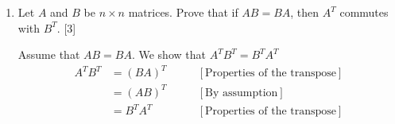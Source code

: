 \documentclass[11pt]{article}
\begin{document}
\begin{enumerate}[label=\alph*)]
    \color{black}

    \item Let \(A\) and \(B\) be \(n\times n\) matrices. Prove that if \(AB = BA\), then \(A^T\) commutes with \(B^T\). \hfill [3]
    \color{blue}

    Assume that \(AB = BA\).
    We show that \(A^TB^T = B^TA^T\)
    \[
        \begin{aligned}
            A^TB^T &= (BA)^T  \qquad &[\text{Properties of the transpose}]\\
            &=(AB)^T \qquad &[\text{By assumption}]\\
            &=B^TA^T    \qquad &[\text{Properties of the transpose}]
        \end{aligned}
    \]
    \color{black}
\end{enumerate}

\newpage
\end{document}
